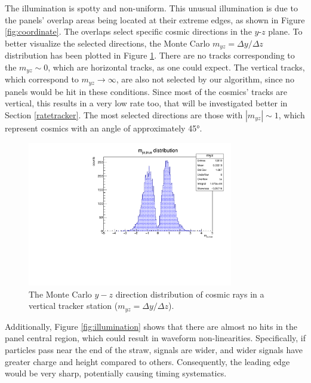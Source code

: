 The illumination is spotty and non-uniform. This unusual illumination is due to the panels' overlap areas being located at their extreme edges, as shown in Figure \ref{fig:coordinate}. 
The overlaps select specific cosmic directions in the $y$-$z$ plane. 
To better visualize the selected directions, the Monte Carlo $m_{yz}=\Delta y /\Delta z$ distribution has been plotted in Figure \ref{fig:myz}.
There are no tracks corresponding to the $m_{yz}\sim 0$, which are horizontal tracks, as one could expect. The vertical tracks, 
which correspond to $m_{yz} \rightarrow \infty$, are also not selected by our algorithm, since no panels would be hit in these conditions. Since most of the cosmics' tracks are vertical, 
this results in a very low rate too, that will be investigated better in Section \ref{ratetracker}. The most selected directions are those with $|m_{yz}| \sim 1$, which represent cosmics with 
an angle of approximately 45°.
\begin{figure}[!h]
    \centering
    \includegraphics[width =0.8\textwidth]{figures/pdf/myz.pdf}
    \caption[The Monte Carlo $y-z$ direction distribution.]{The Monte Carlo $y-z$ direction distribution of cosmic rays in a vertical tracker station ($m_{yz}=\Delta y /\Delta z$).}
    \label{fig:myz}
\end{figure}

Additionally, Figure \ref{fig:illumination} shows that there are almost no hits in the panel central region, which could result in waveform non-linearities.
Specifically, if particles pass near the end of the straw, signals are wider, and wider signals have greater charge and 
height compared to others. Consequently, the leading edge would be very sharp, potentially causing timing systematics.

